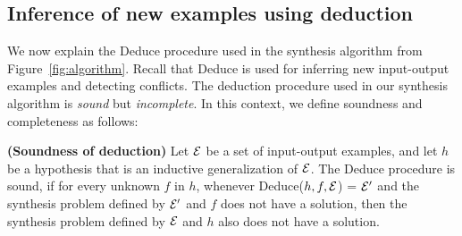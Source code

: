 \subsection{Inference of new examples using deduction}


We now explain the {\sc Deduce} procedure used in the synthesis algorithm
from Figure~\ref{fig:algorithm}.
Recall that {\sc Deduce} is used for 
inferring new input-output examples and detecting conflicts.
The deduction procedure used in our synthesis algorithm is \emph{sound} but \emph{incomplete}. In this context, we
define {soundness} and {completeness} as follows:

\begin{definition}{\bf (Soundness of deduction)} Let $\mathcal{E}$ be a set of
  input-output examples, and let $h$ be a hypothesis that is an
  inductive generalization of $\mathcal{E}$.  The {\sc Deduce} procedure is
  sound, if for every unknown $f$ in $h$, whenever {\sc Deduce}($h, f,
  \mathcal{E}$) = $\mathcal{E}'$ and the synthesis problem defined by $\mathcal{E}'$ and $f$ does
  not have a solution, then the synthesis problem defined by $\mathcal{E}$ and
  $h$ also does not have a solution.
\end{definition}

